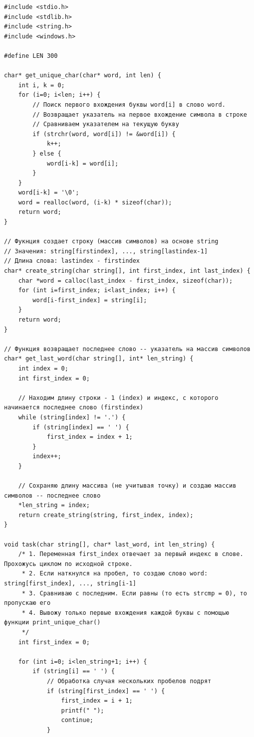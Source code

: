 \documentclass[12pt]{article}
\begin{document}
\begin{lstlisting}[label=string_code1,caption=C]
#include <stdio.h>
#include <stdlib.h>
#include <string.h>
#include <windows.h>

#define LEN 300

char* get_unique_char(char* word, int len) {
    int i, k = 0;
    for (i=0; i<len; i++) {
        // Поиск первого вхождения буквы word[i] в слово word.
        // Возвращает указатель на первое вхождение символа в строке
        // Сравниваем указателем на текущую букву
        if (strchr(word, word[i]) != &word[i]) {
            k++;
        } else {
            word[i-k] = word[i];
        }
    }
    word[i-k] = '\0';
    word = realloc(word, (i-k) * sizeof(char));
    return word;
}

// Фукнция создает строку (массив символов) на основе string
// Значения: string[firstindex], ..., string[lastindex-1]
// Длина слова: lastindex - firstindex
char* create_string(char string[], int first_index, int last_index) {
    char *word = calloc(last_index - first_index, sizeof(char));
    for (int i=first_index; i<last_index; i++) {
        word[i-first_index] = string[i];
    }
    return word;
}

// Функция возвращает последнее слово -- указатель на массив символов
char* get_last_word(char string[], int* len_string) {
    int index = 0;
    int first_index = 0;

    // Находим длину строки - 1 (index) и индекс, с которого начинается последнее слово (firstindex)
    while (string[index] != '.') {
        if (string[index] == ' ') {
            first_index = index + 1;
        }
        index++;
    }

    // Сохраняю длину массива (не учитывая точку) и создаю массив символов -- последнее слово
    *len_string = index;
    return create_string(string, first_index, index);
}

void task(char string[], char* last_word, int len_string) {
    /* 1. Переменная first_index отвечает за первый индекс в слове. Прохожусь циклом по исходной строке.
     * 2. Если наткнулся на пробел, то создаю слово word: string[first_index], ..., string[i-1]
     * 3. Сравниваю с последним. Если равны (то есть strcmp = 0), то пропускаю его
     * 4. Вывожу только первые вхождения каждой буквы с помощью функции print_unique_char()
     */
    int first_index = 0;

    for (int i=0; i<len_string+1; i++) {
        if (string[i] == ' ') {
            // Обработка случая нескольких пробелов подрят
            if (string[first_index] == ' ') {
                first_index = i + 1;
                printf(" ");
                continue;
            }


\end{lstlisting}
\end{document}
